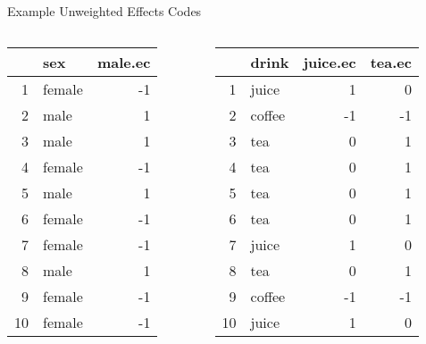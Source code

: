 \documentclass{beamer}\usepackage[]{graphicx}\usepackage[]{color}
\begin{document}
\watermarkoff %

\begin{frame}{Example Unweighted Effects Codes}
  
  \begin{columns}
    \begin{column}{0.5\textwidth}
      
\begin{table}[ht]
\centering
\begin{tabular}{rlr}
  \toprule
 & sex & male.ec \\ 
  \midrule
1 & female & -1 \\ 
  2 & male & 1 \\ 
  3 & male & 1 \\ 
  4 & female & -1 \\ 
  5 & male & 1 \\ 
  6 & female & -1 \\ 
  7 & female & -1 \\ 
  8 & male & 1 \\ 
  9 & female & -1 \\ 
  10 & female & -1 \\ 
   \bottomrule
\end{tabular}
\end{table}


\end{column}
    \begin{column}{0.5\textwidth}
      
\begin{table}[ht]
\centering
\begin{tabular}{rlrr}
  \toprule
 & drink & juice.ec & tea.ec \\ 
  \midrule
1 & juice & 1 & 0 \\ 
  2 & coffee & -1 & -1 \\ 
  3 & tea & 0 & 1 \\ 
  4 & tea & 0 & 1 \\ 
  5 & tea & 0 & 1 \\ 
  6 & tea & 0 & 1 \\ 
  7 & juice & 1 & 0 \\ 
  8 & tea & 0 & 1 \\ 
  9 & coffee & -1 & -1 \\ 
  10 & juice & 1 & 0 \\ 
   \bottomrule
\end{tabular}
\end{table}


\end{column}
\end{columns}

\end{frame}
\end{document}
